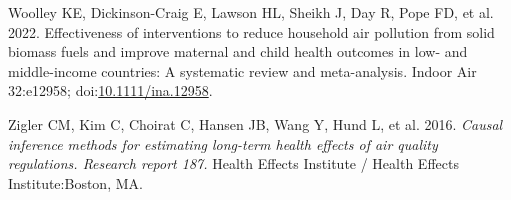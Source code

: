 \documentclass[
  letterpaper,
  DIV=11,
  numbers=noendperiod]{scrartcl}
\newlength{\cslhangindent}
\newenvironment{CSLReferences}[2] %
 {\begin{list}{}{%
  \setlength{\itemindent}{0pt}
  \setlength{\leftmargin}{0pt}
  \setlength{\parsep}{0pt}
  \ifodd #1
   \setlength{\leftmargin}{\cslhangindent}
   \setlength{\itemindent}{-1\cslhangindent}
  \fi
  \setlength{\itemsep}{#2\baselineskip}}}
 {\end{list}}
\begin{document}
\begin{CSLReferences}{1}{1}
Woolley KE, Dickinson-Craig E, Lawson HL, Sheikh J, Day R, Pope FD, et
al. 2022. Effectiveness of interventions to reduce household air
pollution from solid biomass fuels and improve maternal and child health
outcomes in low- and middle-income countries: {A} systematic review and
meta-analysis. Indoor Air 32:e12958;
doi:\href{https://doi.org/10.1111/ina.12958}{10.1111/ina.12958}.

Zigler CM, Kim C, Choirat C, Hansen JB, Wang Y, Hund L, et al. 2016.
\emph{Causal inference methods for estimating long-term health effects
of air quality regulations. {Research} report 187.} {Health Effects
Institute / Health Effects Institute}:{Boston, MA}.

\end{CSLReferences}
\end{document}
